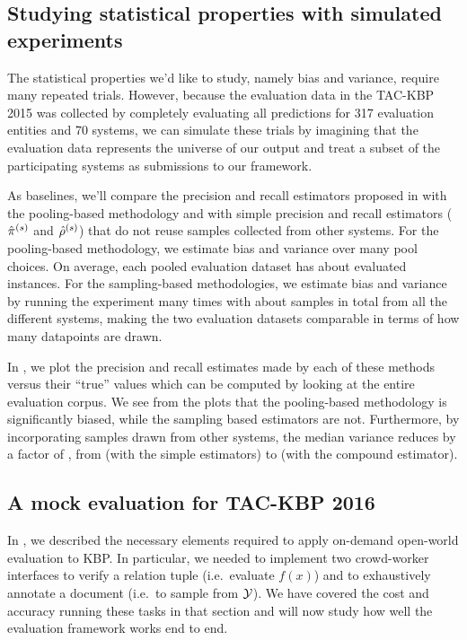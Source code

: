 \subsection{Studying statistical properties with simulated experiments}
The statistical properties we'd like to study, namely bias and variance, require many repeated trials.
However, because the evaluation data in the TAC-KBP 2015 was collected by completely evaluating all predictions for 317 evaluation entities and 70 systems, we can simulate these trials by imagining that the evaluation data represents the universe of our output and treat a subset of the participating systems as submissions to our framework.

As baselines, we'll compare the precision and recall estimators proposed in  with the pooling-based methodology and with simple precision and recall estimators (${\hat{\pi}}^{(s)}$ and ${\hat{\rho}}^{(s)}$) that do not reuse samples collected from other systems.
For the pooling-based methodology, we estimate bias and variance over many pool choices.
  On average, each pooled evaluation dataset has about  evaluated instances.
For the sampling-based methodologies, we estimate bias and variance by running the experiment many times with about  samples in total from all the different systems, making the two evaluation datasets comparable in terms of how many datapoints are drawn.

In , we plot the precision and recall estimates made by each of these methods versus their ``true'' values which can be computed by looking at the entire evaluation corpus.
We see from the plots that the pooling-based methodology is significantly biased, while the sampling based estimators are not.
Furthermore, by incorporating samples drawn from other systems, the median variance reduces by a factor of , from  (with the simple estimators) to  (with the compound estimator).

\subsection{A mock evaluation for TAC-KBP 2016}
In , we described the necessary elements required to apply on-demand open-world evaluation to KBP.
In particular, we needed to implement two crowd-worker interfaces to verify a relation tuple (i.e.\ evaluate $f(x)$) and to exhaustively annotate a document (i.e.\ to sample from $\mathcal{Y}$).
We have covered the cost and accuracy running these tasks in that section and will now study how well the evaluation framework works end to end. 

